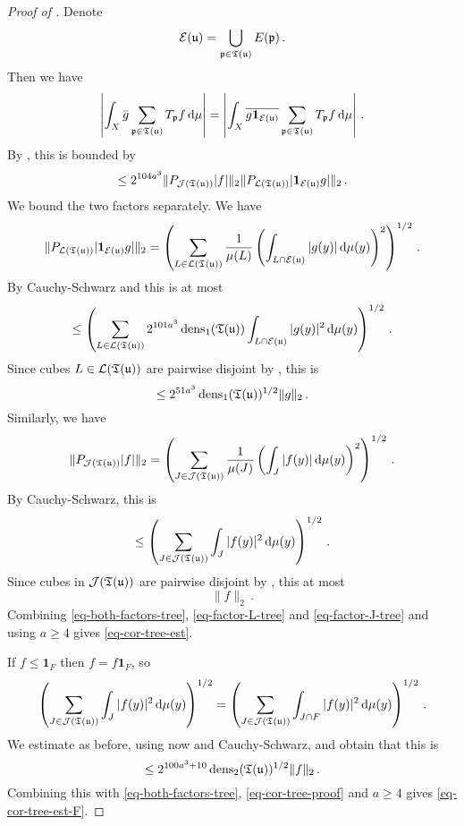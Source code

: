 \begin{proof}[Proof of ]
    Denote
    $$
        \mathcal{E}({\mathfrak u}) = \bigcup_{{\mathfrak p} \in {\mathfrak T}({\mathfrak u})} E({\mathfrak p})\,.
    $$
    Then we have
    $$
        \left| \int_X \bar g \sum_{{\mathfrak p} \in {\mathfrak T}({\mathfrak u})} T_{{\mathfrak p}} f \, \mathrm{d}\mu \right| = \left| \int_X \overline{ g\mathbf{1}_{\mathcal{E}({\mathfrak u})}} \sum_{{\mathfrak p} \in {\mathfrak T}({\mathfrak u})} T_{{\mathfrak p}} f \, \mathrm{d}\mu \right|\,.
    $$
    By , this is bounded by
    \begin{equation}
        \label{eq-both-factors-tree}
        \le 2^{104a^3}\|P_{\mathcal{J}({\mathfrak T}({\mathfrak u}))}|f|\|_2 \|P_{\mathcal{L}({\mathfrak T}({\mathfrak u}))} |\mathbf{1}_{\mathcal{E}({\mathfrak u})}g|\|_2\,.
    \end{equation}
    We bound the two factors separately.
    We have
    $$
        \|P_{\mathcal{L}({\mathfrak T}({\mathfrak u}))} |\mathbf{1}_{\mathcal{E}({\mathfrak u})}g|\|_2 = \left( \sum_{L \in \mathcal{L}({\mathfrak T}({\mathfrak u}))} \frac{1}{\mu(L)} \left(\int_{L \cap \mathcal{E}({\mathfrak u})} |g(y)| \, \mathrm{d}\mu(y)\right)^2 \right)^{1/2}\,.
    $$
    By Cauchy-Schwarz and  this is at most
    $$
        \le \left( \sum_{L \in \mathcal{L}({\mathfrak T}({\mathfrak u}))} 2^{101a^3} \operatorname{\operatorname{dens}}_1({\mathfrak T}({\mathfrak u})) \int_{L \cap \mathcal{E}({\mathfrak u})} |g(y)|^2 \, \mathrm{d}\mu(y) \right)^{1/2}\,.
    $$
    Since cubes $L \in \mathcal{L}({\mathfrak T}({\mathfrak u}))$ are pairwise disjoint by , this is
    \begin{equation}
        \label{eq-factor-L-tree}
         \le 2^{51 a^3} \operatorname{\operatorname{dens}}_1({\mathfrak T}({\mathfrak u}))^{1/2} \|g\|_2\,.
    \end{equation}
    Similarly, we have
    \begin{equation}
        \label{eq-cor-tree-proof}
        \|P_{\mathcal{J}({\mathfrak T}({\mathfrak u}))}|f|\|_2 = \left( \sum_{J \in \mathcal{J}({\mathfrak T}({\mathfrak u}))} \frac{1}{\mu(J)} \left(\int_J |f(y)| \, \mathrm{d}\mu(y)\right)^2 \right)^{1/2}\,.
    \end{equation}
    By Cauchy-Schwarz, this is
    $$
        \le \left( \sum_{J \in \mathcal{J}({\mathfrak T}({\mathfrak u}))} \int_J |f(y)|^2 \, \mathrm{d}\mu(y) \right)^{1/2}\,.
    $$
    Since cubes in $\mathcal{J}({\mathfrak T}({\mathfrak u}))$ are pairwise disjoint by , this at most
    \begin{equation}
        \label{eq-factor-J-tree}
        \|f\|_2\,.
    \end{equation}
    Combining \eqref{eq-both-factors-tree}, \eqref{eq-factor-L-tree} and \eqref{eq-factor-J-tree} and using $a \ge 4$ gives \eqref{eq-cor-tree-est}.

    If $f \le \mathbf{1}_F$ then $f = f\mathbf{1}_F$, so
    $$
        \left( \sum_{J \in \mathcal{J}({\mathfrak T}({\mathfrak u}))} \int_J |f(y)|^2 \, \mathrm{d}\mu(y) \right)^{1/2} = \left( \sum_{J \in \mathcal{J}({\mathfrak T}({\mathfrak u}))} \int_{J \cap F} |f(y)|^2 \, \mathrm{d}\mu(y) \right)^{1/2}\,.
    $$
    We estimate as before, using now  and Cauchy-Schwarz, and obtain that this is
    $$
        \le 2^{100a^3 + 10} \operatorname{\operatorname{dens}}_2({\mathfrak T}({\mathfrak u}))^{1/2} \|f\|_2\,.
    $$
    Combining this with \eqref{eq-both-factors-tree}, \eqref{eq-cor-tree-proof} and $a \ge 4$ gives \eqref{eq-cor-tree-est-F}.
\end{proof}

